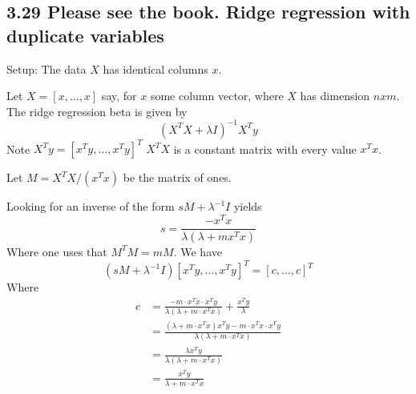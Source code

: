 \subsection*{3.29 Please see the book. Ridge regression with duplicate variables}

Setup: The data $X$ has identical columns $x$.

Let $X = [x, \dots, x]$ say, for $x$ some column vector, where $X$ has dimension $n x m$.
The ridge regression beta is given by 
$$\left(X^T X + \lambda I\right)^{-1} X^T y$$
Note $X^T y = [x^T y, \dots, x^T y]^T$
$X^T X$ is a constant matrix with every value $x^T x$.
 
Let $M = X^T X / (x^T x)$ be the matrix of ones.
 
Looking for an inverse of the form $s M + \lambda^{-1} I$ yields 
$$s = \frac {-x^T x}{\lambda(\lambda + m x^T x)}$$
Where one uses that $M^T M = m M$.
 We have $$(sM + \lambda^{-1} I) [x^T y, \dots, x^T y]^T = [c, \dots, c]^T$$
 Where 
 \begin{align*}
     c &= \frac {-m \cdot x^T x\cdot x^T y}{\lambda (\lambda + m\cdot x^T x)}  + \frac{x^T y}{\lambda}\\
     &= \frac {(\lambda + m\cdot x^T x) x^T y -m \cdot x^T x\cdot x^T y}{\lambda (\lambda + m\cdot x^T x)} \\
     &= \frac {\lambda x^T y}{\lambda (\lambda + m\cdot x^T x)} \\
     &= \frac { x^T y}{ \lambda + m\cdot x^T x} 
 \end{align*}
 

